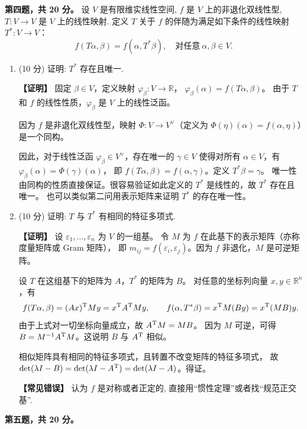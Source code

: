 \textbf{第四题，共 20 分。} 设 $V$ 是有限维实线性空间, $f$ 是 $V$ 上的非退化双线性型, $T:V\to V$ 是 $V$ 上的线性映射. 定义 $T$ 关于 $f$ 的伴随为满足如下条件的线性映射 $T^*:V\to V$：
\[f(T\alpha,\beta)=f(\alpha,T^*\beta),\quad \text{对任意}\ \alpha,\beta\in V.\]
\begin{enumerate}
\item (10 分) 证明: $T^*$ 存在且唯一.

\textbf{【证明】} 固定 $\beta\in V$，定义映射 $\varphi_\beta:V\to\mathbb{R}$，
$\varphi_\beta(\alpha)=f(T\alpha,\beta)$。
由于 $T$ 和 $f$ 的线性性质，$\varphi_\beta$ 是 $V$ 上的线性泛函。

因为 $f$ 是非退化双线性型，映射 $\Phi:V\to V^{\vee}$（定义为 $\Phi(\eta)(\alpha)=f(\alpha,\eta)$）是一个同构。

因此，对于线性泛函 $\varphi_\beta\in V^{\vee}$，存在唯一的 $\gamma\in V$ 
使得对所有 $\alpha\in V$，有 $\varphi_\beta(\alpha)=\Phi(\gamma)(\alpha)$，
即 $f(T\alpha,\beta)=f(\alpha,\gamma)$。定义 $T^*\beta=\gamma$。
唯一性由同构的性质直接保证。很容易验证如此定义的 $T^*$ 是线性的，故 $T^*$ 存在且唯一。
也可以类似第二问用表示矩阵来证明 $T^*$ 的存在唯一性。

\item (10 分) 证明: $T$ 与 $T^*$ 有相同的特征多项式.

\textbf{【证明】} 设 $\varepsilon_1,\dots,\varepsilon_n$ 为 $V$ 的一组基。
令 $M$ 为 $f$ 在此基下的表示矩阵（亦称度量矩阵或 Gram 矩阵），
即 $m_{ij}=f(\varepsilon_i,\varepsilon_j)$。因为 $f$ 非退化，$M$ 是可逆矩阵。

设 $T$ 在这组基下的矩阵为 $A$，$T^*$ 的矩阵为 $B$。
对任意的坐标列向量 $x,y\in\mathbb{R}^n$，有
\[f(T\alpha,\beta)=(Ax)^{\rm T}My=x^{\rm T}A^{\rm T}My,
\qquad
f(\alpha,T^*\beta)=x^{\rm T}M(By)=x^{\rm T}(MB)y.\]
由于上式对一切坐标向量成立，故 $A^{\rm T}M=MB$。
因为 $M$ 可逆，可得 $B=M^{-1}A^{\rm T}M$。这说明 $B$ 与 $A^{\rm T}$ 相似。

相似矩阵具有相同的特征多项式，且转置不改变矩阵的特征多项式，
故 $\det(\lambda I-B)=\det(\lambda I-A^{\rm T})=\det(\lambda I-A)$。得证。

\textbf{【常见错误】} 认为 $f$ 是对称或者正定的, 直接用“惯性定理”或者找“规范正交基”.
\end{enumerate}
\textbf{第五题，共 20 分。}

